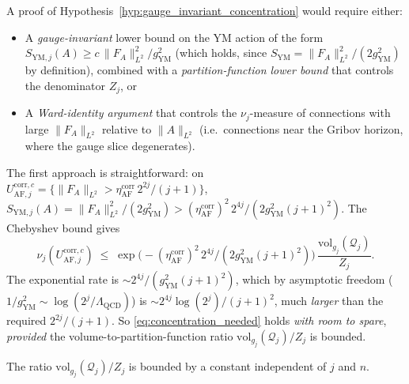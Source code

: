 \begin{remark}
A proof of Hypothesis~\ref{hyp:gauge_invariant_concentration}
would require either:
\begin{itemize}
\item A \emph{gauge-invariant} lower bound on the YM action of the
form $S_{\mathrm{YM},j}(A)\ge c\,\|F_{A}\|_{L^{2}}^{2}/g_{\mathrm{YM}}^{
\mathrm{2}}$ (which holds, since $S_{\mathrm{YM}}=\|F_{A}\|_{L^{
\mathrm{2}}}^{2}/(2g_{\mathrm{YM}}^{2})$ by definition), combined
with a \emph{partition-function lower bound} that controls the
denominator $Z_{j}$, or
\item A \emph{Ward-identity argument} that controls the
$\nu_{j}$-measure of connections with large $\|F_{A}\|_{L^{2}}$
relative to $\|A\|_{L^{2}}$ (i.e.\ connections near the Gribov
horizon, where the gauge slice degenerates).
\end{itemize}
The first approach is straightforward: on
$U_{\mathrm{AF},j}^{\mathrm{corr},c}=\{\|F_{A}\|_{L^{2}}>\eta_{
\mathrm{AF}}^{\mathrm{corr}}\,2^{2j}/(j+1)\}$,
$S_{\mathrm{YM},j}(A)=\|F_{A}\|_{L^{2}}^{2}/(2g_{\mathrm{YM}}^{2})>
(\eta_{\mathrm{AF}}^{\mathrm{corr}})^{2}\,2^{4j}/(2g_{\mathrm{YM}}^{
\mathrm{2}}(j+1)^{2})$. The Chebyshev bound gives
\begin{equation}
\label{eq:chebyshev_gauge_invariant}
  \nu_{j}(U_{\mathrm{AF},j}^{\mathrm{corr},c})
  \;\le\;\exp\!\bigl(-(\eta_{\mathrm{AF}}^{\mathrm{corr}})^{2}\,
  2^{4j}/(2g_{\mathrm{YM}}^{2}(j+1)^{2})\bigr)\,
  \frac{\mathrm{vol}_{g_{j}}(\mathcal{Q}_{j})}{Z_{j}}.
\end{equation}
The exponential rate is
$\sim 2^{4j}/(g_{\mathrm{YM}}^{2}(j+1)^{2})$, which by asymptotic
freedom ($1/g_{\mathrm{YM}}^{2}\sim\log(2^{j}/\Lambda_{\mathrm{QCD}})$)
is $\sim 2^{4j}\log(2^{j})/(j+1)^{2}$, much \emph{larger} than the
required $2^{2j}/(j+1)$. So
\eqref{eq:concentration_needed} holds \emph{with room to spare},
\emph{provided} the volume-to-partition-function ratio
$\mathrm{vol}_{g_{j}}(\mathcal{Q}_{j})/Z_{j}$ is bounded.
\end{remark}

\begin{lemma}
\label{lem:vol_ratio}
The ratio $\mathrm{vol}_{g_{j}}(\mathcal{Q}_{j})/Z_{j}$ is bounded
by a constant independent of $j$ and $n$.
\end{lemma}

